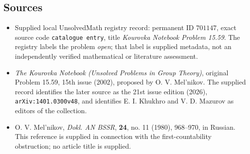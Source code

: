 \documentclass[11pt]{article}
\begin{document}
\subsection{Sources}
\begin{itemize}
\item Supplied local UnsolvedMath registry record: permanent ID \(701147\), exact source code \texttt{catalogue entry}, title \emph{Kourovka Notebook Problem 15.59}. The registry labels the problem \emph{open}; that label is supplied metadata, not an independently verified mathematical or literature assessment.
\item \emph{The Kourovka Notebook (Unsolved Problems in Group Theory)}, original Problem 15.59, 15th issue (2002), proposed by O. V. Mel'nikov. The supplied record identifies the later source as the 21st issue edition (2026), \texttt{arXiv:1401.0300v48}, and identifies E. I. Khukhro and V. D. Mazurov as editors of the collection.
\item O. V. Mel'nikov, \emph{Dokl. AN BSSR}, \textbf{24}, no. 11 (1980), 968--970, in Russian. This reference is supplied in connection with the first-countability obstruction; no article title is supplied.
\end{itemize}
\end{document}
